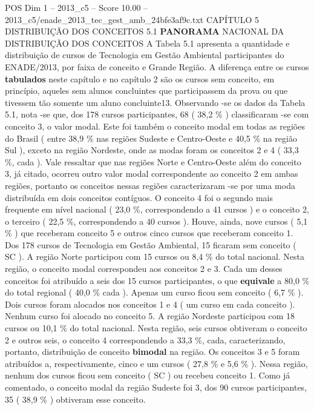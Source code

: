 \begin{textsample}{POS Dim 1 – 2013\_c5 – Score 10.00 – 2013\_c5/enade\_2013\_tec\_gest\_amb\_24bfe3af9c.txt}  \label{ex:f1_pos_081}
CAPÍTULO 5 DISTRIBUIÇÃO DOS CONCEITOS 5.1 \textbf{PANORAMA} NACIONAL DA DISTRIBUIÇÃO DOS CONCEITOS A Tabela 5.1 apresenta a quantidade e distribuição de cursos de Tecnologia em Gestão Ambiental participantes do ENADE/2013, por faixa de conceito e Grande Região.
A diferença entre os cursos \textbf{tabulados} neste capítulo e no capítulo 2 são os cursos sem conceito, em princípio, aqueles sem alunos concluintes que participassem da prova ou que tivessem tão somente um aluno concluinte13.
Observando -se os dados da Tabela 5.1, nota -se que, dos 178 cursos participantes, 68 ( 38,2 \% ) classificaram -se com conceito 3, o valor modal.
Este foi também o conceito modal em todas as regiões do Brasil ( entre 38,9 \% nas regiões Sudeste e Centro-Oeste e 40,5 \% na região Sul ), exceto na região Nordeste, onde as modas foram os conceitos 2 e 4 ( 33,3 \%, cada ).
Vale ressaltar que nas regiões Norte e Centro-Oeste além do conceito 3, já citado, ocorreu outro valor modal correspondente ao conceito 2 em ambas regiões, portanto os conceitos nessas regiões caracterizaram -se por uma moda distribuída em dois conceitos contíguos.
O conceito 4 foi o segundo mais frequente em nível nacional ( 23,0 \%, correspondendo a 41 cursos ) e o conceito 2, o terceiro ( 22,5 \%, correspondendo a 40 cursos ).
Houve, ainda, nove cursos ( 5,1 \% ) que receberam conceito 5 e outros cinco cursos que receberam conceito 1.
Dos 178 cursos de Tecnologia em Gestão Ambiental, 15 ficaram sem conceito ( SC ).
A região Norte participou com 15 cursos ou 8,4 \% do total nacional.
Nesta região, o conceito modal correspondeu aos conceitos 2 e 3.
Cada um desses conceitos foi atribuído a seis dos 15 cursos participantes, o que \textbf{equivale} a 80,0 \% do total regional ( 40,0 \% cada ).
Apenas um curso ficou sem conceito ( 6,7 \% ).
Dois cursos foram alocados nos conceitos 1 e 4 ( um curso em cada conceito ).
Nenhum curso foi alocado no conceito 5.
A região Nordeste participou com 18 cursos ou 10,1 \% do total nacional.
Nesta região, seis cursos obtiveram o conceito 2 e outros seis, o conceito 4 correspondendo a 33,3 \%, cada, caracterizando, portanto, distribuição de conceito \textbf{bimodal} na região.
Os conceitos 3 e 5 foram atribuídos a, respectivamente, cinco e um cursos ( 27,8 \% e 5,6 \% ).
Nessa região, nenhum dos cursos ficou sem conceito ( SC ) ou recebeu conceito 1.
Como já comentado, o conceito modal da região Sudeste foi 3, dos 90 cursos participantes, 35 ( 38,9 \% ) obtiveram esse conceito.

\end{textsample}
